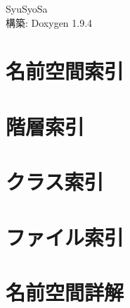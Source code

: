 \documentclass[twoside]{book}
\newcommand{\+}{\discretionary{\mbox{\scriptsize$\hookleftarrow$}}{}{}}
\newcommand{\clearemptydoublepage}{%
    \newpage{\pagestyle{empty}\cleardoublepage}%
  }
\begin{document}
  \raggedbottom
  \begin{CJK}{UTF8}{min}
    \hypersetup{pageanchor=false,
                bookmarksnumbered=true,
                pdfencoding=unicode
               }
  \begin{titlepage}
  \vspace*{7cm}
  \begin{center}%
  {\Large Syu\+Syo\+Sa}\\
  \vspace*{1cm}
  {\large 構築\+: Doxygen 1.9.4}\\
  \end{center}
  \end{titlepage}
  \clearemptydoublepage
  \tableofcontents
  \clearemptydoublepage
  \hypersetup{pageanchor=true}
\chapter{名前空間索引}

\chapter{階層索引}

\chapter{クラス索引}

\chapter{ファイル索引}

\chapter{名前空間詳解}



\end{CJK}
\end{document}

